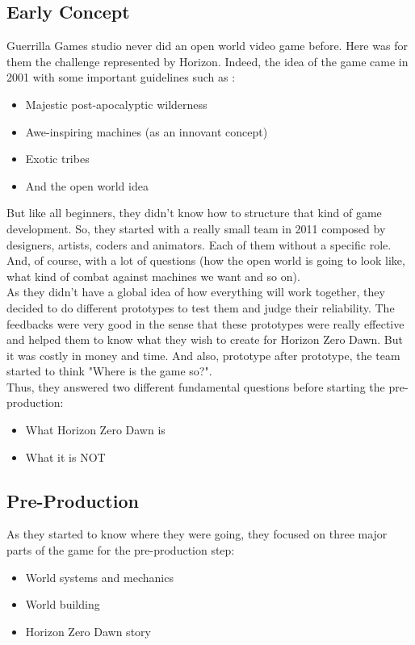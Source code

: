 \documentclass[a4paper]{article}
\begin{document}
\subsection{Early Concept}

Guerrilla Games studio never did an open world video game before. Here was for them the challenge
represented by Horizon. Indeed, the idea of the game came in 2001 with some important guidelines
such as :

\begin{itemize}
  \item Majestic post-apocalyptic wilderness
  \item Awe-inspiring machines (as an innovant concept)
  \item Exotic tribes
  \item And the open world idea 
\end{itemize}

\noindent But like all beginners, they didn't know how to structure that kind of game development. So,
they started with a really small team in 2011 composed by designers, artists, coders and 
animators. Each of them without a specific role. And, of course, with a lot of questions
(how the open world is going to look like, what kind of combat against machines we want and so on).\\

\noindent As they didn't have a global idea of how everything will work together, they decided to
do different prototypes to test them and judge their reliability. The feedbacks were very
good in the sense that these prototypes were really effective and helped them to know
what they wish to create for Horizon Zero Dawn. But it was costly in money and time. And also, 
prototype after prototype, the team started to think "Where is the game so?".\\

\noindent Thus, they answered two different fundamental questions before starting the pre-production:
\begin{itemize}
  \item What Horizon Zero Dawn is
  \item What it is NOT
\end{itemize}


\subsection{Pre-Production}

As they started to know where they were going, they focused on three major parts of the game for
the pre-production step:
\begin{itemize}
  \item World systems and mechanics
  \item World building
  \item Horizon Zero Dawn story
\end{itemize}
\end{document}
